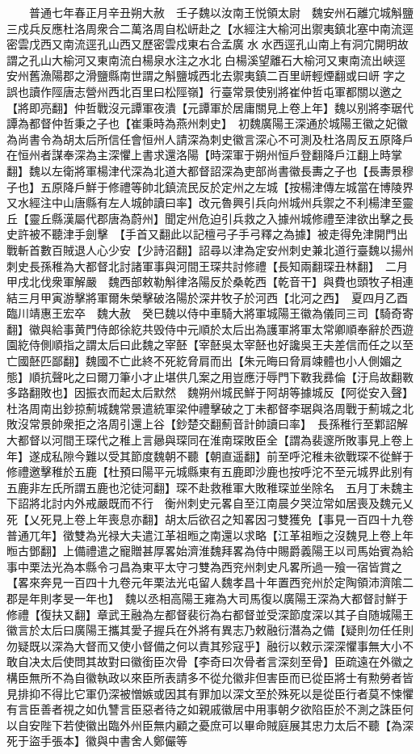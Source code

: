 　　普通七年春正月辛丑朔大赦　壬子魏以汝南王悦領太尉　魏安州石離宂城斛鹽三戍兵反應杜洛周衆合二萬洛周自松岍赴之【水經注大榆河出禦夷鎮北塞中南流逕密雲戊西又南流逕孔山西又歷密雲戍東右合孟廣水水西逕孔山南上有洞宂開明故謂之孔山大榆河又東南流白楊泉水注之水北白楊溪望離石大榆河又東南流出峽逕安州舊漁陽郡之滑鹽縣南世謂之斛鹽城西北去禦夷鎮二百里岍輕煙翻或曰岍字之誤也讀作陘唐志營州西北百里曰松陘嶺】行臺常景使别將崔仲哲屯軍都關以邀之【將即亮翻】仲哲戰沒元譚軍夜潰【元譚軍於居庸關見上卷上年】魏以别將李琚代譚為都督仲哲秉之子也【崔秉時為燕州刺史】　初魏廣陽王深通於城陽王徽之妃徽為尚書令為胡太后所信任會恒州人請深為刺史徽言深心不可測及杜洛周反五原降戶在恒州者謀奉深為主深懼上書求還洛陽【時深軍于朔州恒戶登翻降戶江翻上時掌翻】魏以左衛將軍楊津代深為北道大都督詔深為吏部尚書徽長夀之子也【長夀景穆子也】五原降戶鮮于修禮等帥北鎮流民反於定州之左城【按楊津傳左城當在博陵界又水經注中山唐縣有左人城帥讀曰率】改元魯興引兵向州城州兵禦之不利楊津至靈丘【靈丘縣漢屬代郡唐為蔚州】聞定州危迫引兵救之入據州城修禮至津欲出擊之長史許被不聽津手劍擊　【手首又翻此以記檀弓子手弓釋之為據】被走得免津開門出戰斬首數百賊退人心少安【少詩沼翻】詔尋以津為定安州刺史兼北道行臺魏以揚州刺史長孫稚為大都督北討諸軍事與河間王琛共討修禮【長知兩翻琛丑林翻】　二月甲戌北伐衆軍解嚴　魏西部敕勒斛律洛陽反於桑乾西【乾音干】與費也頭牧子相連結三月甲寅游擊將軍爾朱榮擊破洛陽於深井牧子於河西【北河之西】　夏四月乙酉臨川靖惠王宏卒　魏大赦　癸巳魏以侍中車騎大將軍城陽王徽為儀同三司【騎奇寄翻】徽與給事黄門侍郎徐紇共毁侍中元順於太后出為護軍將軍太常卿順奉辭於西遊園紇侍側順指之謂太后曰此魏之宰噽【宰噽吳太宰噽也好讒吳王夫差信而任之以至亡國噽匹鄙翻】魏國不亡此終不死紇脅肩而出【朱元晦曰脅肩竦體也小人側媚之態】順抗聲叱之曰爾刀筆小才止堪供几案之用豈應汙辱門下斁我彞倫【汙烏故翻斁多路翻敗也】因振衣而起太后默然　魏朔州城民鮮于阿胡等據城反【阿從安入聲】　杜洛周南出鈔掠薊城魏常景遣統軍梁仲禮擊破之丁未都督李琚與洛周戰于薊城之北敗沒常景帥衆拒之洛周引還上谷【鈔楚交翻薊音計帥讀曰率】　長孫稚行至鄴詔解大都督以河間王琛代之稚上言曏與琛同在淮南琛敗臣全【謂為裴邃所敗事見上卷上年】遂成私隙今難以受其節度魏朝不聽【朝直遥翻】前至呼沱稚未欲戰琛不從鮮于修禮邀擊稚於五鹿【杜預曰陽平元城縣東有五鹿即沙鹿也按呼沱不至元城界此别有五鹿非左氏所謂五鹿也沱徒河翻】琛不赴救稚軍大敗稚琛並坐除名　五月丁未魏主下詔將北討内外戒嚴既而不行　衡州刺史元畧自至江南晨夕哭泣常如居喪及魏元乂死【乂死見上卷上年喪息亦翻】胡太后欲召之知畧因刁雙獲免【事見一百四十九卷普通兀年】徵雙為光禄大夫遣江革祖暅之南還以求略【江革祖暅之沒魏見上卷上年暅古鄧翻】上備禮遣之寵贈甚厚畧始濟淮魏拜畧為侍中賜爵義陽王以司馬始賓為給事中栗法光為本縣令刁昌為東平太守刁雙為西兖州刺史凡畧所過一飱一宿皆賞之【畧來奔見一百四十九卷元年栗法光屯留人魏孝昌十年置西兖州於定陶領沛濟隂二郡是年則孝旻一年也】　魏以丞相高陽王雍為大司馬復以廣陽王深為大都督討鮮于修禮【復扶又翻】章武王融為左都督裴衍為右都督並受深節度深以其子自随城陽王徽言於太后曰廣陽王攜其愛子握兵在外將有異志乃敕融衍潛為之備【疑則勿任任則勿疑既以深為大督而又使小督備之何以責其殄寇乎】融衍以敕示深深懼事無大小不敢自决太后使問其故對曰徽銜臣次骨【李奇曰次骨者言深刻至骨】臣疏遠在外徽之構臣無所不為自徽執政以來臣所表請多不從允徽非但害臣而已從臣將士有勲勞者皆見排抑不得比它軍仍深被憎嫉或因其有罪加以深文至於殊死以是從臣行者莫不悚懼有言臣善者視之如仇讐言臣惡者待之如親戚徽居中用事朝夕欲陷臣於不測之誅臣何以自安陛下若使徽出臨外州臣無内顧之憂庶可以畢命賊庭展其忠力太后不聽【為深死于盜手張本】徽與中書舍人鄭儼等